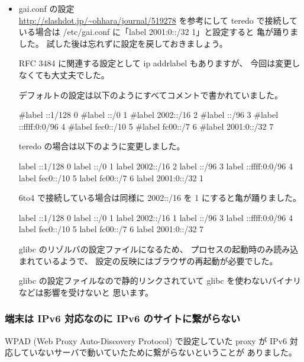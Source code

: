 \documentclass[mingoth,a4paper]{jsarticle}
\begin{document}
\begin{itemize}
\item gai.conf の設定\\
\url{http://slashdot.jp/\~ohhara/journal/519278} を参考にして
teredo で接続している場合は
/etc/gai.conf に「label 2001:0::/32   1」と設定すると
亀が踊りました。
試した後は忘れずに設定を戻しておきましょう。

RFC 3484 に関連する設定として ip addrlabel もありますが、
今回は変更しなくても大丈夫でした。

デフォルトの設定は以下のようにすべてコメントで書かれていました。

\begin{commandline}
#label ::1/128       0
#label ::/0          1
#label 2002::/16     2
#label ::/96         3
#label ::ffff:0:0/96 4
#label fec0::/10     5
#label fc00::/7      6
#label 2001:0::/32   7
\end{commandline}

teredo の場合は以下のように変更しました。

\begin{commandline}
label ::1/128       0
label ::/0          1
label 2002::/16     2
label ::/96         3
label ::ffff:0:0/96 4
label fec0::/10     5
label fc00::/7      6
label 2001:0::/32   1
\end{commandline}

6to4 で接続している場合は同様に 2002::/16 を 1 にすると亀が踊りました。

\begin{commandline}
label ::1/128       0
label ::/0          1
label 2002::/16     1
label ::/96         3
label ::ffff:0:0/96 4
label fec0::/10     5
label fc00::/7      6
label 2001:0::/32   7
\end{commandline}

glibc のリゾルバの設定ファイルになるため、
プロセスの起動時のみ読み込まれているようで、
設定の反映にはブラウザの再起動が必要でした。

glibc の設定ファイルなので静的リンクされていて
glibc を使わないバイナリなどは影響を受けないと
思います。

\end{itemize} %
\subsubsection{端末は IPv6 対応なのに IPv6 のサイトに繋がらない}

WPAD (Web Proxy Auto-Discovery Protocol) で設定していた proxy が
IPv6 対応していないサーバで動いていたために繋がらないということが
ありました。
\end{document}
